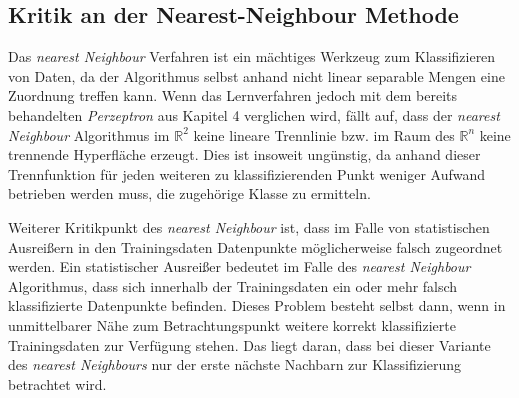 \documentclass[fontsize=11pt]{scrartcl}
\begin{document}
            \subsection{Kritik an der      Nearest-Neighbour Methode}
                Das \emph{nearest Neighbour} Verfahren ist ein mächtiges Werkzeug zum Klassifizieren von Daten, da der Algorithmus selbst anhand nicht linear separable Mengen eine Zuordnung treffen kann.\cite{ertel2016} Wenn das Lernverfahren jedoch mit dem bereits behandelten \emph{Perzeptron} aus Kapitel 4 verglichen wird, fällt auf, dass der \emph{nearest Neighbour} Algorithmus im $\mathbb{R}^2$ keine lineare Trennlinie bzw. im Raum des $\mathbb{R}^n$ keine trennende Hyperfläche erzeugt. Dies ist insoweit ungünstig, da anhand dieser Trennfunktion für jeden weiteren zu klassifizierenden Punkt weniger Aufwand betrieben werden muss, die zugehörige Klasse zu ermitteln.\cite{ertel2016}\par
                Weiterer Kritikpunkt des \emph{nearest Neighbour} ist, dass im Falle von statistischen Ausreißern in den Trainingsdaten Datenpunkte möglicherweise falsch zugeordnet werden. Ein statistischer Ausreißer bedeutet im Falle des \emph{nearest Neighbour} Algorithmus, dass sich innerhalb der Trainingsdaten ein oder mehr falsch klassifizierte Datenpunkte befinden. Dieses Problem besteht selbst dann, wenn in unmittelbarer Nähe zum Betrachtungspunkt weitere korrekt klassifizierte Trainingsdaten zur Verfügung stehen. Das liegt daran, dass bei dieser Variante des \emph{nearest Neighbours} nur der erste nächste Nachbarn zur Klassifizierung betrachtet wird.\cite{ertel2016}\par
\end{document}
